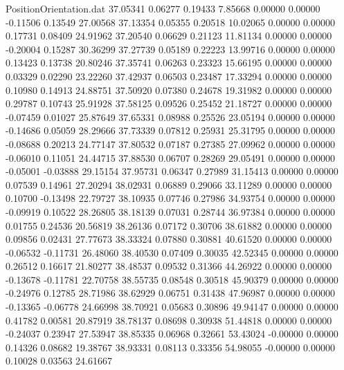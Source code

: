 \begin{filecontents}{PositionOrientation.dat}
  37.05341    0.06277    0.19433     7.85668    0.00000    0.00000   -0.11506    0.13549   27.00568
  37.13354    0.05355    0.20518    10.02065    0.00000    0.00000    0.17731    0.08409   24.91962
  37.20540    0.06629    0.21123    11.81134    0.00000    0.00000   -0.20004    0.15287   30.36299
  37.27739    0.05189    0.22223    13.99716    0.00000    0.00000    0.13423    0.13738   20.80246
  37.35741    0.06263    0.23323    15.66195    0.00000    0.00000    0.03329    0.02290   23.22260
  37.42937    0.06503    0.23487    17.33294    0.00000    0.00000    0.10980    0.14913   24.88751
  37.50920    0.07380    0.24678    19.31982    0.00000    0.00000    0.29787    0.10743   25.91928
  37.58125    0.09526    0.25452    21.18727    0.00000    0.00000   -0.07459    0.01027   25.87649
  37.65331    0.08988    0.25526    23.05194    0.00000    0.00000   -0.14686    0.05059   28.29666
  37.73339    0.07812    0.25931    25.31795    0.00000    0.00000   -0.08688    0.20213   24.77147
  37.80532    0.07187    0.27385    27.09962    0.00000    0.00000   -0.06010    0.11051   24.44715
  37.88530    0.06707    0.28269    29.05491    0.00000    0.00000   -0.05001   -0.03888   29.15154
  37.95731    0.06347    0.27989    31.15413    0.00000    0.00000    0.07539    0.14961   27.20294
  38.02931    0.06889    0.29066    33.11289    0.00000    0.00000    0.10700   -0.13498   22.79727
  38.10935    0.07746    0.27986    34.93754    0.00000    0.00000   -0.09919    0.10522   28.26805
  38.18139    0.07031    0.28744    36.97384    0.00000    0.00000    0.01755    0.24536   20.56819
  38.26136    0.07172    0.30706    38.61882    0.00000    0.00000    0.09856    0.02431   27.77673
  38.33324    0.07880    0.30881    40.61520    0.00000    0.00000   -0.06532   -0.11731   26.48060
  38.40530    0.07409    0.30035    42.52345    0.00000    0.00000    0.26512    0.16617   21.80277
  38.48537    0.09532    0.31366    44.26922    0.00000    0.00000   -0.13678   -0.11781   22.70758
  38.55735    0.08548    0.30518    45.90379    0.00000    0.00000   -0.24976    0.12785   28.71986
  38.62929    0.06751    0.31438    47.96987    0.00000    0.00000   -0.13365   -0.06778   24.66998
  38.70921    0.05683    0.30896    49.94147    0.00000    0.00000    0.41782    0.00581   20.87919
  38.78137    0.08698    0.30938    51.44818    0.00000    0.00000   -0.24037    0.23947   27.53947
  38.85335    0.06968    0.32661    53.43024   -0.00000    0.00000    0.14326    0.08682   19.38767
  38.93331    0.08113    0.33356    54.98055   -0.00000    0.00000    0.10028    0.03563   24.61667

\end{filecontents}
